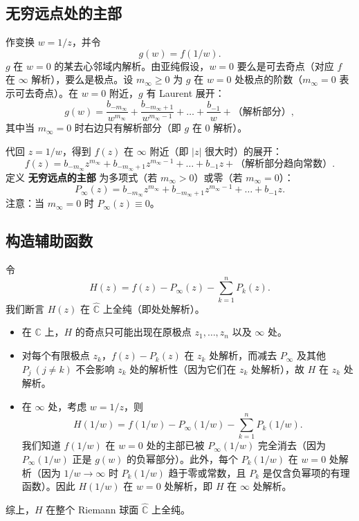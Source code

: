 \documentclass[UTF8]{ctexart}
\numberwithin{equation}{section}
\newcommand{\CC}{\mathbb{C}}
\begin{document}
\subsection{无穷远点处的主部}

作变换 $w = 1/z$，并令
\[
g(w) = f(1/w).
\]
$g$ 在 $w=0$ 的某去心邻域内解析。由亚纯假设，$w=0$ 要么是可去奇点（对应 $f$ 在 $\infty$ 解析），要么是极点。设 $m_\infty \ge 0$ 为 $g$ 在 $w=0$ 处极点的阶数（$m_\infty = 0$ 表示可去奇点）。在 $w=0$ 附近，$g$ 有 Laurent 展开：
\[
g(w) = \frac{b_{-m_\infty}}{w^{m_\infty}} + \frac{b_{-m_\infty+1}}{w^{m_\infty-1}} + \dots + \frac{b_{-1}}{w} + \text{（解析部分）},
\]
其中当 $m_\infty = 0$ 时右边只有解析部分（即 $g$ 在 $0$ 解析）。

代回 $z = 1/w$，得到 $f(z)$ 在 $\infty$ 附近（即 $|z|$ 很大时）的展开：
\[
f(z) = b_{-m_\infty} z^{m_\infty} + b_{-m_\infty+1} z^{m_\infty-1} + \dots + b_{-1} z + \text{（解析部分趋向常数）}.
\]
定义 \textbf{无穷远点的主部} 为多项式（若 $m_\infty > 0$）或零（若 $m_\infty = 0$）：
\[
P_\infty(z) = b_{-m_\infty} z^{m_\infty} + b_{-m_\infty+1} z^{m_\infty-1} + \dots + b_{-1} z.
\]
注意：当 $m_\infty = 0$ 时 $P_\infty(z) \equiv 0$。

\subsection{构造辅助函数}

令
\[
H(z) = f(z) - P_\infty(z) - \sum_{k=1}^{n} P_k(z).
\]
我们断言 $H(z)$ 在 $\widehat{\CC}$ 上全纯（即处处解析）。

\begin{itemize}
\item 在 $\CC$ 上，$H$ 的奇点只可能出现在原极点 $z_1,\dots,z_n$ 以及 $\infty$ 处。
\item 对每个有限极点 $z_k$，$f(z)-P_k(z)$ 在 $z_k$ 处解析，而减去 $P_\infty$ 及其他 $P_j\ (j\ne k)$ 不会影响 $z_k$ 处的解析性（因为它们在 $z_k$ 处解析），故 $H$ 在 $z_k$ 处解析。
\item 在 $\infty$ 处，考虑 $w = 1/z$，则
\[
H(1/w) = f(1/w) - P_\infty(1/w) - \sum_{k=1}^{n} P_k(1/w).
\]
我们知道 $f(1/w)$ 在 $w=0$ 处的主部已被 $P_\infty(1/w)$ 完全消去（因为 $P_\infty(1/w)$ 正是 $g(w)$ 的负幂部分）。此外，每个 $P_k(1/w)$ 在 $w=0$ 处解析（因为 $1/w \to \infty$ 时 $P_k(1/w)$ 趋于零或常数，且 $P_k$ 是仅含负幂项的有理函数）。因此 $H(1/w)$ 在 $w=0$ 处解析，即 $H$ 在 $\infty$ 处解析。
\end{itemize}

综上，$H$ 在整个 Riemann 球面 $\widehat{\CC}$ 上全纯。
\end{document}
